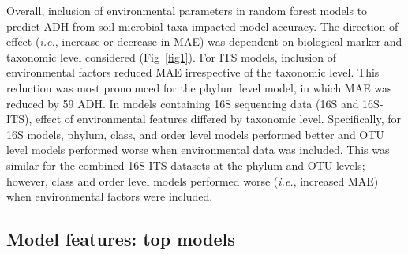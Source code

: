 \documentclass[
  10pt,
  letterpaper,
]{article}
\begin{document}
Overall, inclusion of environmental parameters in random forest models
to predict ADH from soil microbial taxa impacted model accuracy. The
direction of effect (\emph{i.e.}, increase or decrease in MAE) was
dependent on biological marker and taxonomic level considered
(Fig~\ref{fig1}). For ITS models, inclusion of environmental factors
reduced MAE irrespective of the taxonomic level. This reduction was most
pronounced for the phylum level model, in which MAE was reduced by 59
ADH. In models containing 16S sequencing data (16S and 16S-ITS), effect
of environmental features differed by taxonomic level. Specifically, for
16S models, phylum, class, and order level models performed better and
OTU level models performed worse when environmental data was included.
This was similar for the combined 16S-ITS datasets at the phylum and OTU
levels; however, class and order level models performed worse
(\emph{i.e.}, increased MAE) when environmental factors were included.

\hypertarget{model-features-top-models}{%
\subsection{Model features: top
models}\label{model-features-top-models}}
\end{document}
